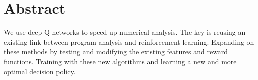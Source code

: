 
\chapter*{Abstract}
We use deep Q-networks to speed up numerical analysis. The key is reusing an existing link between program analysis and reinforcement learning. Expanding on these methods by testing and modifying the existing features and reward functions. Training with these new algorithms and learning a new and more optimal decision policy.
